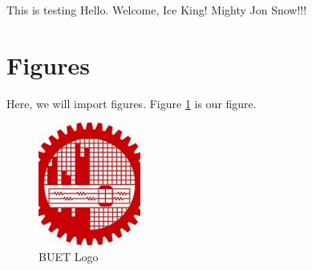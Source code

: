 \documentclass{book}
\newcommand{\testcommand}{Hello}
\newcommand{\anothertestcommand}[2]{Welcome, #2! Mighty #1!!!}
\begin{document}
This is testing \testcommand. \anothertestcommand{Jon Snow}{Ice King}

\section{Figures}

Here, we will import figures. Figure \ref{fig:bl} is our figure.

\begin{figure}[h!]
    \centering
    \includegraphics[width = 0.3\textwidth]{figures/logo.png}
    \caption{BUET Logo}
    \label{fig:bl}
\end{figure}

\lipsum
\end{document}
